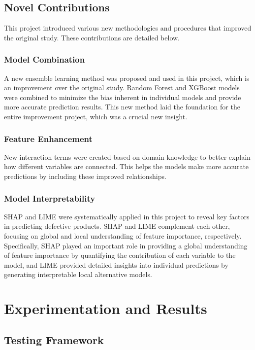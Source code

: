 \documentclass[conference]{IEEEtran}
\begin{document}
\subsection{Novel Contributions}

This project introduced various new methodologies and procedures that improved the original study. These contributions are detailed below.

\subsubsection{Model Combination}

A new ensemble learning method was proposed and used in this project, which is an improvement over the original study. Random Forest and XGBoost models were combined to minimize the bias inherent in individual models and provide more accurate prediction results. This new method laid the foundation for the entire improvement project, which was a crucial new insight.

\subsubsection{Feature Enhancement}
New interaction terms were created based on domain knowledge to better explain how different variables are connected. This helps the models make more accurate predictions by including these improved relationships.

\subsubsection{Model Interpretability}

SHAP and LIME were systematically applied in this project to reveal key factors in predicting defective products. SHAP and LIME complement each other, focusing on global and local understanding of feature importance, respectively. Specifically, SHAP played an important role in providing a global understanding of feature importance by quantifying the contribution of each variable to the model, and LIME provided detailed insights into individual predictions by generating interpretable local alternative models.


\section{Experimentation and Results}

\subsection{Testing Framework}
\end{document}
